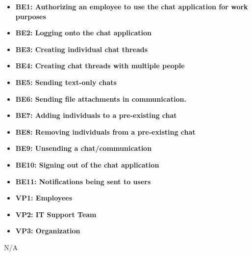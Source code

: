 \documentclass[]{article}
\begin{document}
 \begin{itemize}
    \item {\bf BE1: Authorizing an employee to use the chat application for work purposes}
    \item {\bf BE2: Logging onto the chat application}
    \item {\bf BE3: Creating individual chat threads}
    \item {\bf BE4: Creating chat threads with multiple people}
    \item {\bf BE5: Sending text-only chats}
    \item {\bf BE6: Sending file attachments in communication.}
    \item {\bf BE7: Adding individuals to a pre-existing chat}
    \item {\bf BE8: Removing individuals from a pre-existing chat}
    \item {\bf BE9: Unsending a chat/communication}
    \item {\bf BE10: Signing out of the chat application}
    \item {\bf BE11: Notifications being sent to users}
\end{itemize}

 \begin{itemize}
    \item {\bf VP1: Employees}
    \item {\bf VP2: IT Support Team}
    \item {\bf VP3: Organization}
\end{itemize}

 N/A

	
\end{document}
